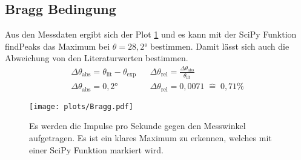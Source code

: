 \subsection{Bragg Bedingung}
Aus den Messdaten ergibt sich der Plot \ref{fig:Bragg} und es kann mit der SciPy Funktion findPeaks das Maximum bei $\theta = 28,2°$ bestimmen.
Damit lässt sich auch die Abweichung von den Literaturwerten bestimmen.
\begin{align*}
    \Delta \theta_{\text{abs}} = \theta_{\text{lit}}-\theta_{\text{exp}} && \Delta \theta_{\text{rel}} = \frac{\Delta \theta_{\text{abs}}}{\theta_{\text{lit}}}\\
    \Delta \theta_{\text{abs}} = 0,2° &&     \Delta \theta_{\text{rel}} = 0,0071 \; \hat{=} \; 0,71 \% 
\end{align*}
\begin{figure}
    \centering
    \texttt{[image: plots/Bragg.pdf]}
    \caption{Es werden die Impulse pro Sekunde gegen den Messwinkel aufgetragen. Es ist ein klares Maximum zu erkennen, welches mit einer SciPy Funktion markiert wird.}
    \label{fig:Bragg}
\end{figure}

